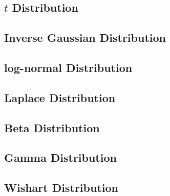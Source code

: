 \subsection{$t$ Distribution}
\subsection{Inverse Gaussian Distribution}
\subsection{log-normal Distribution}
\subsection{Laplace Distribution}
\subsection{Beta Distribution}
\subsection{Gamma Distribution}
\subsection{Wishart Distribution} 